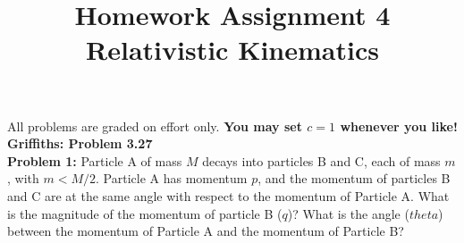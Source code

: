 \documentclass[12pt]{article}
\begin{document}
\newcommand{\ihbar}{\ensuremath{i \hbar}}
\newcommand{\dPsidt}{\ensuremath{ \frac{\partial \Psi}{\partial t} }}
\newcommand{\dPsidx}{\ensuremath{ \frac{\partial \Psi}{\partial x} }}
\newcommand{\ddPsidx}{\ensuremath{ \frac{\partial^2 \Psi}{\partial x^2} }}
\newcommand{\dPssdt}{\ensuremath{ \frac{\partial \Psi^*}{\partial t} }}
\newcommand{\dPssdx}{\ensuremath{ \frac{\partial \Psi^*}{\partial x} }}
\newcommand{\ddPssdx}{\ensuremath{ \frac{\partial^2 \Psi^*}{\partial x^2} }}

\newcommand{\dphidt}{\ensuremath{ \frac{d \phi}{dt} }}
\newcommand{\dpsidx}{\ensuremath{ \frac{d \psi}{dx} }}
\newcommand{\ddpsidx}{\ensuremath{ \frac{d^2 \psi}{dx^2} }}


\date{\vspace{-5ex}}

\title{Homework Assignment 4 \\ Relativistic Kinematics}

\maketitle

\noindent
All problems are graded on effort only. {\bf You may set $c=1$ whenever you like!}\\

\noindent
{\bf Griffiths: Problem 3.27}\\[3pt]

\noindent
{\bf Problem 1:}
Particle A of mass $M$ decays into particles B and C, each of mass
$m$, with $m < M/2$.  Particle A has momentum $p$, and the momentum of
particles B and C are at the same angle with respect to the momentum
of Particle A.  What is the magnitude of the momentum of particle B
($q$)?  What is the angle ($theta$) between the momentum of Particle A
and the momentum of Particle B?

\begin{center}
\end{center}
\end{document}
